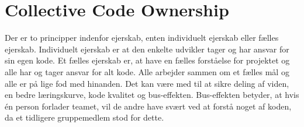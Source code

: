 \section{Collective Code Ownership}\label{sec:collective}
Der er to principper indenfor ejerskab, enten individuelt ejerskab eller fælles ejerskab. 
Individuelt ejerskab er at den enkelte udvikler tager og har ansvar for sin egen kode. 
Et fælles ejerskab er, at have en fælles forståelse for projektet og alle har og tager ansvar for alt kode. 
Alle arbejder sammen om et fælles mål og alle er på lige fod med hinanden. 
Det kan være med til at sikre deling af viden, en bedre læringskurve, kode kvalitet og bus-effekten.
Bus-effekten betyder, at hvis én person forlader teamet, vil de andre have svært ved at forstå noget af koden, 
da et tidligere gruppemedlem stod for dette.